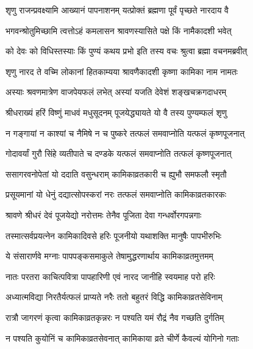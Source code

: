 
\twolineshloka
{शृणु राजन्प्रवक्ष्यामि आख्यानं पापनाशनम्}
{यत्प्रोक्तं ब्रह्मणा पूर्वं पृच्छते नारदाय वै}%


\twolineshloka
{भगवन्श्रोतुमिच्छामि त्वत्तोऽहं कमलासन}
{श्रावणस्यासिते पक्षे किं नामैकादशी भवेत्}%

\twolineshloka
{को देवः को विधिस्तस्याः किं पुण्यं कथय प्रभो}
{इति तस्य वचः श्रुत्वा ब्रह्मा वचनमब्रवीत्}%


\twolineshloka
{शृणु नारद ते वच्मि लोकानां हितकाम्यया}
{श्रावणैकादशी कृष्णा कामिका नाम नामतः}%

\twolineshloka
{अस्याः श्रवणमात्रेण वाजपेयफलं लभेत्}
{अस्यां यजति देवेशं शङ्खचक्रगदाधरम्}%

\twolineshloka
{श्रीधराख्यं हरिं विष्णुं माधवं मधुसूदनम्}
{पूजयेद्ध्यायते यो वै तस्य पुण्यम्फलं शृणु}%

\twolineshloka
{न गङ्गायां न काश्यां च नैमिषे न च पुष्करे}
{तत्फलं समवाप्नोति यत्फलं कृष्णपूजनात्}%

\twolineshloka
{गोदावर्यां गुरौ सिंहे व्यतीपाते च दण्डके}
{यत्फलं समवाप्नोति तत्फलं कृष्णपूजनात्}%

\twolineshloka
{ससागरवनोपेतां यो ददाति वसुन्धराम्}
{कामिकाव्रतकारी च ह्युभौ समफलौ स्मृतौ}%

\twolineshloka
{प्रसूयमानां यो धेनुं दद्यात्सोपस्करां नरः}
{तत्फलं समवाप्नोति कामिकाव्रतकारकः}%

\twolineshloka
{श्रावणे श्रीधरं देवं पूजयेद्यो नरोत्तमः}
{तेनैव पूजिता देवा गन्धर्वोरगपन्नगाः}%

\twolineshloka
{तस्मात्सर्वप्रयत्नेन कामिकादिवसे हरिः}
{पूजनीयो यथाशक्ति मानुषैः पापभीरुभिः}%

\twolineshloka
{ये संसारार्णवे मग्नाः पापपङ्कसमाकुले}
{तेषामुद्धरणार्थाय कामिकाव्रतमुत्तमम्}%

\twolineshloka
{नातः परतरा काचित्पवित्रा पापहारिणी}
{एवं नारद जानीहि स्वयमाह परो हरिः}%

\twolineshloka
{अध्यात्मविद्या निरतैर्यत्फलं प्राप्यते नरैः}
{ततो बहुतरं विद्धि कामिकाव्रतसेविनाम्}%

\twolineshloka
{रात्रौ जागरणं कृत्वा कामिकाव्रतकृन्नरः}
{न पश्यति यमं रौद्रं नैव गच्छति दुर्गतिम्}%

\twolineshloka
{न पश्यति कुयोनिं च कामिकाव्रतसेवनात्}
{कामिकाया व्रते चीर्णे कैवल्यं योगिनो गताः}%

